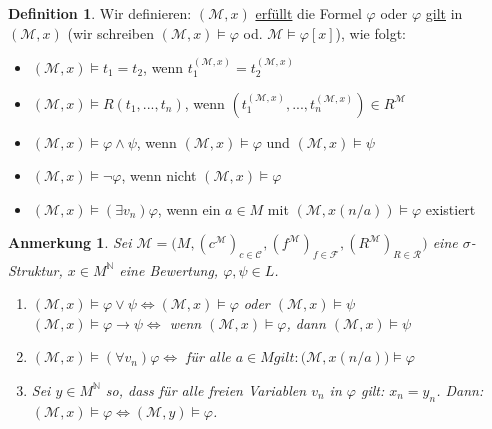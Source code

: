 \documentclass{article}
\theoremstyle{definition}
\newtheorem{dfn}{Definition}[section]
\theoremstyle{plain}
\newtheorem*{anm}{Anmerkung}
\newcommand{\calC}{\mathcal{C}}
\newcommand{\calF}{\mathcal{F}}
\newcommand{\calM}{\mathcal{M}}
\newcommand{\calR}{\mathcal{R}}
\newcommand{\struc}[3]{\big(#1, (c^{#2})_{c \in \calC_{#3}}, (f^{#2})_{f \in \calF_{#3}}, (R^{#2})_{R \in \calR_{#3}}\big)}
\begin{document}
    \begin{dfn}
        Wir definieren: $ (\calM, x) $ \underline{erfüllt} die Formel $ \varphi $ oder $ \varphi $ \underline{gilt} in $ (\calM, x) $ (wir schreiben $ (\calM, x) \models \varphi $ od. $ \calM \models \varphi[x] $), wie folgt:
        \begin{itemize}
            \item $ (\calM, x) \models t_1 = t_2 $, wenn $ t^{(\calM, x)}_1 = t^{(\calM, x)}_2 $
            \item $ (\calM, x) \models R(t_1, ..., t_n) $, wenn $ (t_1^{(\calM, x)}, ..., t_n^{(\calM, x)}) \in R^\calM $
            \item $ (\calM, x) \models \varphi \land \psi $, wenn $ (\calM, x) \models \varphi $ und $ (\calM, x) \models \psi $
            \item $ (\calM, x) \models \neg \varphi $, wenn nicht $ (\calM, x) \models \varphi $
            \item $ (\calM, x) \models (\exists v_n) \varphi $, wenn ein $ a \in M $ mit $ (\calM, x(n/a)) \models \varphi $ existiert
        \end{itemize}
    \end{dfn}

    \begin{anm}
        Sei $ \calM = \struc{M}{\calM}{} $ eine $ \sigma $-Struktur, $ x \in M^{\mathbb{N}} $ eine Bewertung, $\varphi, \psi \in L $.
        \begin{enumerate}
            \item $ (\calM, x) \models \varphi \lor \psi \Leftrightarrow (\calM, x) \models \varphi $ oder $ (\calM, x) \models \psi $\\
            $ (\calM, x) \models \varphi \rightarrow \psi \Leftrightarrow $ wenn $ (\calM, x) \models \varphi $, dann $ ( \calM, x) \models \psi $
            \item $ (\calM, x) \models (\forall v_n) \varphi \Leftrightarrow $ für alle $ a \in M gilt: \big(\calM, x(n/a)\big) \models \varphi $
            \item Sei $ y \in M^{\mathbb{N}} $ so, dass für alle freien Variablen $ v_n $ in $ \varphi $ gilt: $ x_n = y_n $.
            Dann: $ (\calM, x) \models \varphi \Leftrightarrow (\calM, y ) \models \varphi $. \label{itm:freie-variablen-gleich}
        \end{enumerate}
    \end{anm}
\end{document}

